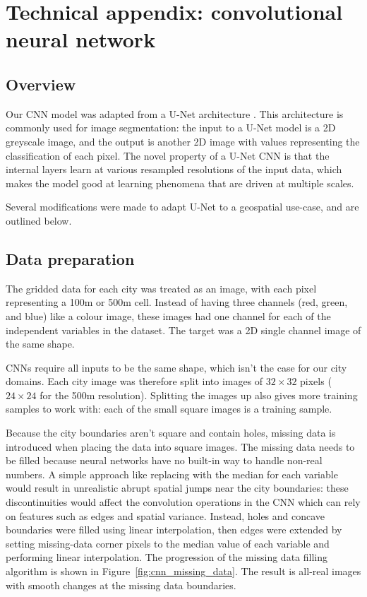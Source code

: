 \documentclass[final,3p,times,twocolumn,sort&compress]{elsarticle}
\begin{document}
\newpage
\section{Technical appendix: convolutional neural network}
\label{ss:cnn}
\subsection{Overview}

Our CNN model was adapted from a U-Net architecture \cite{unet}. This architecture is commonly used for image segmentation: the input to a U-Net model is a 2D greyscale image, and the output is another 2D image with values representing the classification of each pixel. The novel property of a U-Net CNN is that the internal layers learn at various resampled resolutions of the input data, which makes the model good at learning phenomena that are driven at multiple scales.

Several modifications were made to adapt U-Net to a geospatial use-case, and are outlined below.


\subsection{Data preparation}

The gridded data for each city was treated as an image, with each pixel representing a 100m or 500m cell. Instead of having three channels (red, green, and blue) like a colour image, these images had one channel for each of the independent variables in the dataset. The target was a 2D single channel image of the same shape.

CNNs require all inputs to be the same shape, which isn't the case for our city domains. Each city image was therefore split into images of $32 \times 32$ pixels ($24 \times 24$ for the 500m resolution). Splitting the images up also gives more training samples to work with: each of the small square images is a training sample.

Because the city boundaries aren't square and contain holes, missing data is introduced when placing the data into square images. The missing data needs to be filled because neural networks have no built-in way to handle non-real numbers. A simple approach like replacing with the median for each variable would result in unrealistic abrupt spatial jumps near the city boundaries: these discontinuities would affect the convolution operations in the CNN which can rely on features such as edges and spatial variance. Instead, holes and concave boundaries were filled using linear interpolation, then edges were extended by setting missing-data corner pixels to the median value of each variable and performing linear interpolation. The progression of the missing data filling algorithm is shown in Figure~\ref{fig:cnn_missing_data}. The result is all-real images with smooth changes at the missing data boundaries.
\end{document}
